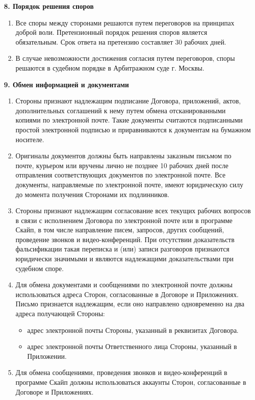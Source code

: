 \documentclass[a4paper, fontsize=12bp]{article}
\newcounter{enum}
\begin{document}
\begin{center}
\newpage
\textbf{8. Порядок решения споров}
\end{center}
\begin{enumerate}[label=\arabic{enum}.\arabic*.]
\item Все споры между сторонами решаются путем переговоров на принципах доброй воли. Претензионный порядок решения споров является обязательным. Срок ответа на претензию составляет 30 рабочих дней.

\item В случае невозможности достижения согласия путем переговоров, споры решаются в судебном порядке в Арбитражном суде г. Москвы.
\end{enumerate}


\begin{center}
\textbf{9. Обмен информацией и документами}
\end{center}
\begin{enumerate}[label=\arabic{enum}.\arabic*.]
\item Стороны признают надлежащим подписание Договора, приложений, актов, дополнительных соглашений к нему путем обмена отсканированными копиями по электронной почте. Такие документы считаются подписанными простой электронной подписью и приравниваются к документам на бумажном носителе.

\item Оригиналы документов должны быть направлены заказным письмом по почте, курьером или вручены лично не позднее 10 рабочих дней после отправления соответствующих документов по электронной почте. Все документы, направляемые по электронной почте, имеют юридическую силу до момента получения Сторонами их подлинников.

\item Стороны признают надлежащим согласование всех текущих рабочих вопросов в связи с исполнением Договора по электронной почте или в программе Скайп, в том числе направление писем, запросов, других сообщений, проведение звонков и видео-конференций. При отсутствии доказательств фальсификации такая переписка и (или) записи разговоров признаются юридически значимыми и являются надлежащими доказательствами при судебном споре.

\item Для обмена документами и сообщениями по электронной почте должны использоваться адреса Сторон, согласованные в Договоре и Приложениях. Письмо признается надлежащим, если оно направлено одновременно на два адреса получающей Стороны:
\begin{itemize}
	\item адрес электронной почты Стороны, указанный в реквизитах Договора.

	\item адрес электронной почты Ответственного лица Стороны, указанный в Приложении.
\end{itemize}

\item Для обмена сообщениями, проведения звонков и видео-конференций в программе Скайп должны использоваться аккаунты Сторон, согласованные в Договоре и Приложениях.
\end{enumerate}
\end{document}
